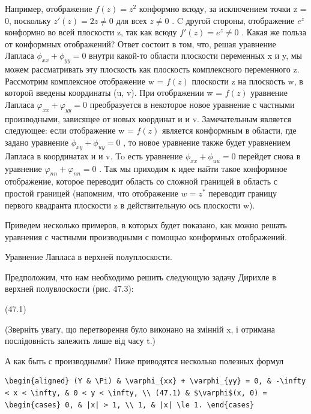 \documentclass[
  ukrainian,
]{article}
\begin{document}
Например, отображение \(f(z) = z^2\) конформно всюду, за исключением
точки z = 0, поскольку \(z'(z) = 2z \neq 0\) для всех \(z \neq 0\) . C
другой стороны, отображение \(e^z\) конформно во всей плоскости z, так
как всюду \(f'(z) = e^z \neq 0\) . Какая же польза от конформных
отображений? Ответ состоит в том, что, решая уравнение Лапласа
\(\phi_{xx} + \phi_{yy} = 0\) внутри какой-то области плоскости
переменных x и y, мы можем рассматривать эту плоскость как плоскость
комплексного переменного z. Рассмотрим комплексное отображение w =
\(f(z)\) плоскости z на плоскость w, в которой введены координаты (u,
v). При отображении w = \(f(z)\) уравнение Лапласа
\(\varphi_{xx} + \varphi_{yy} = 0\) преобразуется в некоторое новое
уравнение с частными производными, зависящее от новых координат и и v.
Замечательным является следующее: если отображение w = \(f(z)\) является
конформным в области, где задано уравнение \(\phi_{xy} + \phi_{uy} = 0\)
, то новое уравнение также будет уравнением Лапласа в координатах и и v.
To есть уравнение \(\phi_{xx} + \phi_{uu} = 0\) перейдет снова в
уравнение \(\varphi_{nn} + \varphi_{nn} = 0\) . Так мы приходим к идее
найти такое конформное отображение, которое переводит область со сложной
границей в область с простой границей (напомним, что отображение
\(w=z^*\) переводит границу первого квадранта плоскости z в
действительную ось плоскости w).

Приведем несколько примеров, в которых будет показано, как можно решать
уравнения с частными производными с помощью конформных отображений.

Уравнение Лапласа в верхней полуплоскости.

Предположим, что нам необходимо решить следующую задачу Дирихле в
верхней полувлоскости (рис. 47.3):

(47.1)

(Зверніть увагу, що перетворення було виконано на змінній x, і отримана
послідовність залежить лише від часу t.)

А как быть с производными? Ниже приводятся несколько полезных формул

\begin{verbatim}
\begin{aligned} (Y & \Pi) & \varphi_{xx} + \varphi_{yy} = 0, & -\infty < x < \infty, & 0 < y < \infty, \\ (47.1) & $\varphi$(x, 0) = \begin{cases} 0, & |x| > 1, \\ 1, & |x| \le 1. \end{cases}
\end{verbatim}
\end{document}

